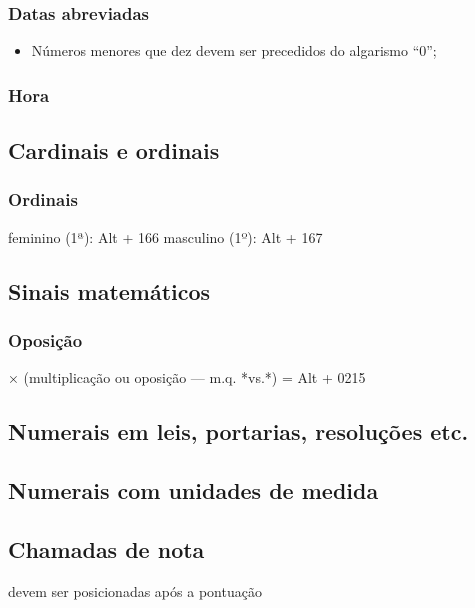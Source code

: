 \subsubsection{Datas abreviadas}

\begin{itemize}
	\item Números menores que dez devem ser precedidos do algarismo ``0'';
\end{itemize}

\subsubsection{Hora}

\subsection{Cardinais e ordinais}

\subsubsection{Ordinais}

feminino (1ª): Alt + 166
masculino (1º): Alt + 167

\subsection{Sinais matemáticos}

\subsubsection{Oposição}

× (multiplicação ou oposição — m.q. *vs.*) = Alt + 0215

\subsection{Numerais em leis, portarias, resoluções etc.}

\subsection{Numerais com unidades de medida}

\subsection{Chamadas de nota}

devem ser posicionadas após a pontuação

